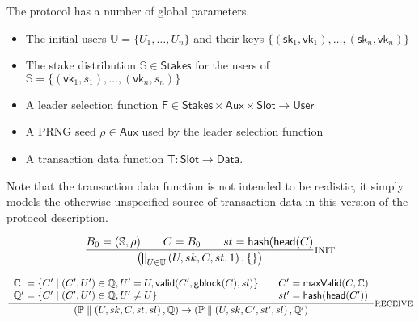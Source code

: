 \documentclass[12pt]{article}
\newcommand{\where}{\mathrel{|}}
\newcommand{\fun}[1]{\mathsf{#1}}
\newcommand{\sPar}{\mathrel{\parallel}}
\newcommand{\sSystem}[2]{\left( #1, #2 \right)}
\newcommand{\sProcess}[3]{\left( U, sk, #1, #2, #3 \right)}
\newcommand{\sChain}{C}
\newcommand{\sChains}{\mathbb{C}}
\newcommand{\sState}{st}
\newcommand{\sSlot}{sl}
\newcommand{\sLeader}{\mathsf{F}}
\newcommand{\sQueue}{\mathbb{Q}}
\newcommand{\sProcesses}{\mathbb{P}}
\newcommand{\sHead}{\mathsf{head}}
\begin{document}
The protocol has a number of global parameters.
\begin{itemize}
\item The initial users $\mathbb{U} = \{U_1, \ldots, U_n\}$ and their keys $\{(\mathsf{sk}_1, \mathsf{vk}_1), \ldots, (\mathsf{sk}_n, \mathsf{vk}_n)\}$
\item The stake distribution $\mathbb{S} \in \mathsf{Stakes}$ for the users of $\mathbb{S} = \{ (\mathsf{vk}_1, s_1), \ldots, (\mathsf{vk}_n, s_n) \}$
\item A leader selection function $\sLeader \in \mathsf{Stakes} \times \mathsf{Aux} \times \mathsf{Slot} \rightarrow \mathsf{User}$
\item A PRNG seed $\rho \in \mathsf{Aux}$ used by the leader selection function
\item A transaction data function $\mathsf{T} : \mathsf{Slot} \rightarrow \mathsf{Data}$.
\end{itemize}

Note that the transaction data function is not intended to be realistic,
it simply models the otherwise unspecified source of transaction data in
this version of the protocol description.

\bigskip

\begin{equation*}
\frac{
  B_0 = (\mathbb{S}, \rho)
  \qquad
  \sChain = B_0
  \qquad
  \sState = \fun{hash}(\sHead(\sChain)
}{
  \sSystem{ \bigparallel_{U \in \mathbb{U}} \sProcess{\sChain}{\sState}{1}}{\{\}}
} \textsc{init}
\end{equation*}

\bigskip

\begin{equation*}
\frac{
\begin{array}{l@{\;}c@{\;}l@{\qquad}l@{\;}c@{\;}l}
  \sChains & = & \left\{ \sChain' \where (\sChain', U') \in \sQueue, U' = U, \fun{valid}(\sChain', \fun{gblock}(\sChain), sl) \right\}
  &
  \sChain' & = & \fun{maxValid}(\sChain, \sChains)
  \\
  \sQueue' & = & \left\{ \sChain' \where (\sChain', U') \in \sQueue, U' \neq U \right\}
  &
  \sState' & = & \fun{hash}(\sHead(\sChain'))
\end{array}
}{
  \sSystem{\sProcesses \sPar \sProcess{\sChain}{\sState}{\sSlot} }{\sQueue}
\rightarrow
  \sSystem{\sProcesses \sPar \sProcess{\sChain'}{\sState'}{\sSlot} }{\sQueue'}
} \textsc{receive}
\end{equation*}

\bigskip
\end{document}
